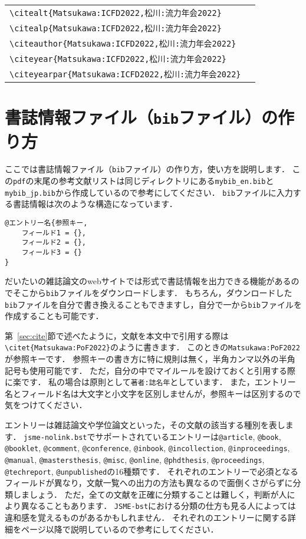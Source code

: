 \documentclass[a4paper,fleqn,uplatex,dvipdfmx]{jsarticle}
\makeatletter
\newcommand{\jsmefile}{\texttt{jsme-nolink.bst}}
\newcommand{\JSMErepos}{\texttt{JSME-bst}}
\newcommand{\ttarticle}{\texttt{@article}}
\newcommand{\ttbook}{\texttt{@book}}
\newcommand{\ttbooklet}{\texttt{@booklet}}
\newcommand{\ttcomment}{\texttt{@comment}}
\newcommand{\ttconference}{\texttt{@conference}}
\newcommand{\ttinbook}{\texttt{@inbook}}
\newcommand{\ttincollection}{\texttt{@incollection}}
\newcommand{\ttinproceedings}{\texttt{@inproceedings}}
\newcommand{\ttmanual}{\texttt{@manual}}
\newcommand{\ttmastersthesis}{\texttt{@mastersthesis}}
\newcommand{\ttmisc}{\texttt{@misc}}
\newcommand{\ttonline}{\texttt{@online}}
\newcommand{\ttphdthesis}{\texttt{@phdthesis}}
\newcommand{\ttproceedings}{\texttt{@proceedings}}
\newcommand{\tttechreport}{\texttt{@techreport}}
\newcommand{\ttunpublished}{\texttt{@unpublished}}
\makeatother
\begin{document}
\begin{table}[t]
\begin{tabular}{ll}
        \verb|\citealt{Matsukawa:ICFD2022,松川:流力年会2022}|         &\citealt{Matsukawa:ICFD2022,松川:流力年会2022} \\
        \verb|\citealp{Matsukawa:ICFD2022,松川:流力年会2022}|         &\citealp{Matsukawa:ICFD2022,松川:流力年会2022} \\
        \verb|\citeauthor{Matsukawa:ICFD2022,松川:流力年会2022}|      &\citeauthor{Matsukawa:ICFD2022,松川:流力年会2022} \\
        \verb|\citeyear{Matsukawa:ICFD2022,松川:流力年会2022}|        &\citeyear{Matsukawa:ICFD2022,松川:流力年会2022} \\
        \verb|\citeyearpar{Matsukawa:ICFD2022,松川:流力年会2022}|     &\citeyearpar{Matsukawa:ICFD2022,松川:流力年会2022}
    \end{tabular}
\end{table}


\clearpage
\section{書誌情報ファイル（\texttt{bib}ファイル）の作り方}
\label{sec:bib}
ここでは書誌情報ファイル（\texttt{bib}ファイル）の作り方，使い方を説明します．
この\verb|pdf|の末尾の参考文献リストは同じディレクトリにある\verb|mybib_en.bib|と\verb|mybib_jp.bib|から作成しているので参考にしてください．
\verb|bib|ファイルに入力する書誌情報は次のような構造になっています．
\begin{verbatim}
@エントリー名{参照キー,
    フィールド1 = {},
    フィールド2 = {},
    フィールド3 = {}
}
\end{verbatim}
だいたいの雑誌論文のwebサイトでは\BibTeX{}形式で書誌情報を出力できる機能があるのでそこから\verb|bib|ファイルをダウンロードします．
もちろん，ダウンロードした\verb|bib|ファイルを自分で書き換えることもできますし，自分で一から\verb|bib|ファイルを作成することも可能です．

第~\ref{sec:cite}節で述べたように，文献を本文中で引用する際は\verb|\citet{Matsukawa:PoF2022}|のように書きます．
このときの\verb|Matsukawa:PoF2022|が参照キーです．
参照キーの書き方に特に規則は無く，半角カンマ以外の半角記号も使用可能です．
ただ，自分の中でマイルールを設けておくと引用する際に楽です．
私の場合は原則として\texttt{\colorbox[gray]{0.8}{著者}:\colorbox[gray]{0.8}{誌名}\colorbox[gray]{0.8}{年}}としています．
また，エントリー名とフィールド名は大文字と小文字を区別しませんが，参照キーは区別するので気をつけてください．

エントリーは雑誌論文や学位論文といった，その文献の該当する種別を表します．
\jsmefile でサポートされているエントリーは\ttarticle, \ttbook, \ttbooklet, \ttcomment, \ttconference, \ttinbook, \ttincollection, \ttinproceedings, \ttmanual, \ttmastersthesis, \ttmisc, \ttonline, \ttphdthesis, \ttproceedings, \tttechreport, \ttunpublished の16種類です．
それぞれのエントリーで必須となるフィールドが異なり，文献一覧への出力の方法も異なるので面倒くさがらずに分類しましょう．
ただ，全ての文献を正確に分類することは難しく，判断が人により異なることもあります．
\JSMErepos における分類の仕方も見る人によっては違和感を覚えるものがあるかもしれません．
それぞれのエントリーに関する詳細を\pageref{ssec:article}ページ以降で説明しているので参考にしてください．
\end{document}
